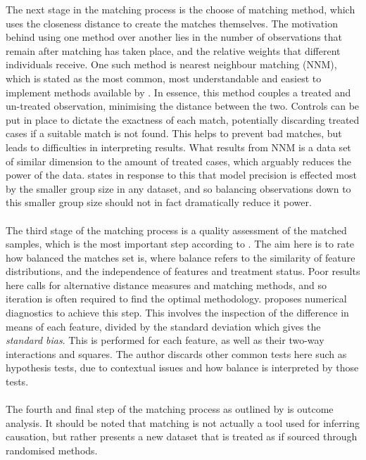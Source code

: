 {The next stage in the matching process is the choose of matching method, which uses the closeness distance to create the matches themselves. The motivation behind using one method over another lies in the number of observations that remain after matching has taken place, and the relative weights that different individuals receive. One such method is nearest neighbour matching (NNM), which is stated as the most common, most understandable and easiest to implement methods available by \cite{stuart2010matching}. In essence, this method couples a treated and un-treated observation, minimising the distance between the two. Controls can be put in place to dictate the exactness of each match, potentially discarding treated cases if a suitable match is not found. This helps to prevent bad matches, but leads to difficulties in interpreting results. What results from NNM is a data set of similar dimension to the amount of treated cases, which arguably reduces the power of the data. \cite{stuart2010matching} states in response to this that model precision is effected most by the smaller group size in any dataset, and so balancing observations down to this smaller group size should not in fact dramatically reduce it power. 
\\\\
The third stage of the matching process is a quality assessment of the matched samples, which is the most important step according to \cite{stuart2010matching}. The aim here is to rate how balanced the matches set is, where balance refers to the similarity of feature distributions, and the independence of features and treatment status. Poor results here calls for alternative distance measures and matching methods, and so iteration is often required to find the optimal methodology. \cite{stuart2010matching} proposes numerical diagnostics to achieve this step. This involves the inspection of the difference in means of each feature, divided by the standard deviation which gives the {\it standard bias}. This is performed for each feature, as well as their two-way interactions and squares. The author discards other common tests here such as hypothesis tests, due to contextual issues and how balance is interpreted by those tests. 
 \\\\ 
The fourth and final step of the matching process as outlined by \cite{stuart2010matching} is outcome analysis. It should be noted that matching is not actually a tool used for inferring causation, but rather presents a new dataset that is treated as if sourced through randomised methods.  
}
